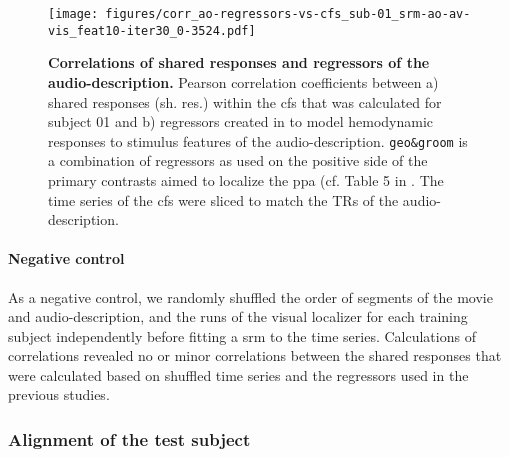 \begin{figure*}[tbp]
\centering
    \texttt{[image: figures/corr\_ao-regressors-vs-cfs\_sub-01\_srm-ao-av-vis\_feat10-iter30\_0-3524.pdf]}
    \caption{
    \textbf{Correlations of shared responses and regressors of the audio-description.}
    Pearson correlation coefficients between a) shared responses (sh. res.)
    within the \ac{cfs} that was calculated for subject 01 and b) regressors
    created in \citet{haeusler2022processing} to model hemodynamic responses to
    stimulus features of the audio-description.
    \texttt{geo\&groom} is a combination of
    regressors as used on the positive side of the primary contrasts aimed to
    localize the \ac{ppa} (cf. Table 5 in \citet{haeusler2022processing}.
    The time series of the \ac{cfs} were sliced to match the TRs of the
    audio-description.
    }
    \label{fig:corr-ao-reg-srm}
\end{figure*}





\paragraph{Negative control}
As a negative control, we randomly shuffled the order of segments of the movie
and audio-description, and the runs of the visual localizer for each training
subject independently before fitting a \ac{srm} to the time series.
Calculations of correlations revealed no or minor correlations between the
shared responses that were calculated based on shuffled time series and the
regressors used in the previous studies.


\subsubsection{Alignment of the test subject}





